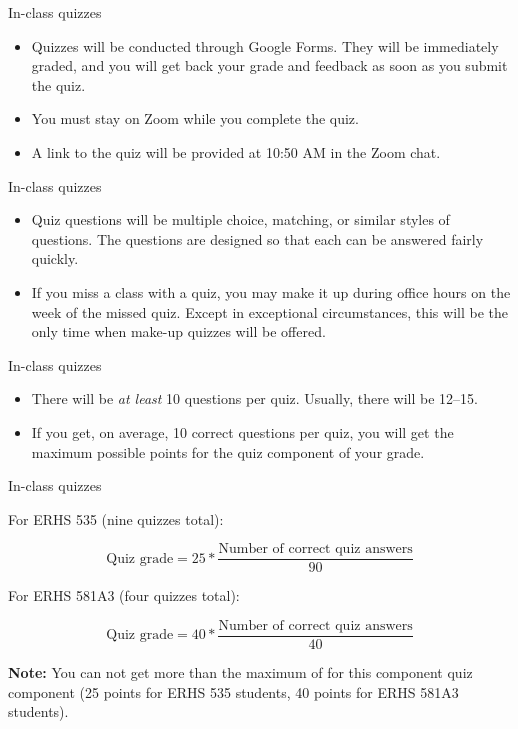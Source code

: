 \documentclass[
  10pt,
  ignorenonframetext,
]{beamer}
\providecommand{\tightlist}{%
  \setlength{\itemsep}{0pt}\setlength{\parskip}{0pt}}
\begin{document}
\begin{frame}{In-class quizzes}
\protect\hypertarget{in-class-quizzes-1}{}

\begin{itemize}
\tightlist
\item
  Quizzes will be conducted through Google Forms. They will be
  immediately graded, and you will get back your grade and feedback as
  soon as you submit the quiz.
\item
  You must stay on Zoom while you complete the quiz.
\item
  A link to the quiz will be provided at 10:50 AM in the Zoom chat.
\end{itemize}

\end{frame}

\begin{frame}{In-class quizzes}
\protect\hypertarget{in-class-quizzes-2}{}

\begin{itemize}
\tightlist
\item
  Quiz questions will be multiple choice, matching, or similar styles of
  questions. The questions are designed so that each can be answered
  fairly quickly.
\item
  If you miss a class with a quiz, you may make it up during office
  hours on the week of the missed quiz. Except in exceptional
  circumstances, this will be the only time when make-up quizzes will be
  offered.
\end{itemize}

\end{frame}

\begin{frame}{In-class quizzes}
\protect\hypertarget{in-class-quizzes-3}{}

\begin{itemize}
\tightlist
\item
  There will be \emph{at least} 10 questions per quiz. Usually, there
  will be 12--15.
\item
  If you get, on average, 10 correct questions per quiz, you will get
  the maximum possible points for the quiz component of your grade.
\end{itemize}

\end{frame}

\begin{frame}{In-class quizzes}
\protect\hypertarget{in-class-quizzes-4}{}

For ERHS 535 (nine quizzes total):

\[
\mbox{Quiz grade} = 25 * \frac{\mbox{Number of correct quiz answers}}{90}
\]

For ERHS 581A3 (four quizzes total):

\[
\mbox{Quiz grade} = 40 * \frac{\mbox{Number of correct quiz answers}}{40}
\]

\textbf{Note:} You can not get more than the maximum of for this
component quiz component (25 points for ERHS 535 students, 40 points for
ERHS 581A3 students).

\end{frame}
\end{document}
